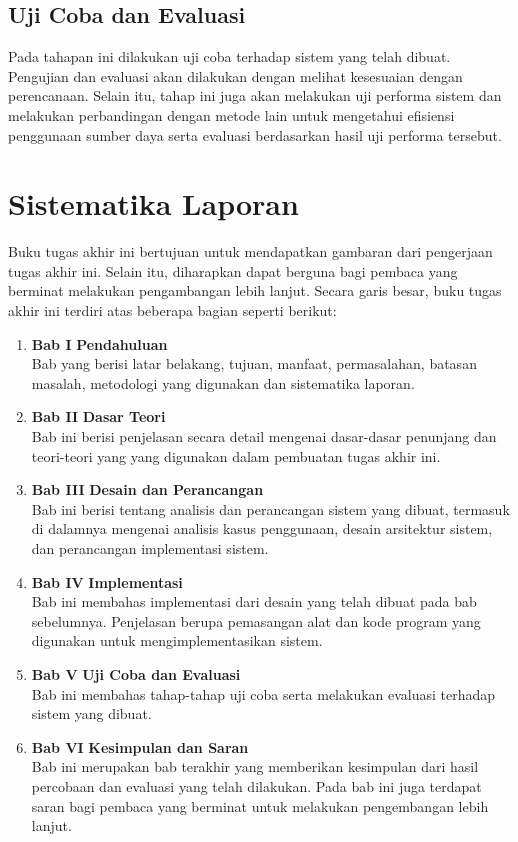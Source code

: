 \subsection{Uji Coba dan Evaluasi}
Pada tahapan ini dilakukan uji coba terhadap sistem yang telah dibuat. Pengujian dan evaluasi akan dilakukan dengan melihat kesesuaian dengan perencanaan. Selain itu, tahap ini juga akan melakukan uji performa sistem dan melakukan perbandingan dengan metode lain untuk mengetahui efisiensi penggunaan sumber daya serta evaluasi berdasarkan hasil uji performa tersebut. 

\section{Sistematika Laporan}
Buku tugas akhir ini bertujuan untuk mendapatkan gambaran dari pengerjaan tugas akhir ini. Selain itu, diharapkan dapat berguna bagi pembaca yang berminat melakukan pengambangan lebih lanjut. Secara garis besar, buku tugas akhir ini terdiri atas beberapa bagian seperti berikut:
\begin{enumerate}

\item \textbf{Bab I} \indent \textbf{Pendahuluan} \\        
\indent \indent Bab yang berisi latar belakang, tujuan, manfaat, permasalahan, batasan masalah, metodologi yang digunakan dan sistematika laporan.
\\
\item \textbf{Bab II} \indent \textbf{Dasar Teori}
\\
\indent \indent Bab ini berisi penjelasan secara detail mengenai dasar-dasar penunjang dan teori-teori yang yang digunakan dalam pembuatan tugas akhir ini.
\\
\item \textbf{Bab III} \indent \textbf{Desain dan Perancangan}
\\
\indent \indent Bab ini berisi tentang analisis dan perancangan sistem yang dibuat, termasuk di dalamnya mengenai analisis kasus penggunaan, desain arsitektur sistem, dan perancangan implementasi sistem.
\\
\item \textbf{Bab IV} \indent \textbf{Implementasi}
\\
\indent \indent Bab ini membahas implementasi dari desain yang telah dibuat pada bab sebelumnya. Penjelasan berupa pemasangan alat dan kode program yang digunakan untuk mengimplementasikan sistem.
\\
\item \textbf{Bab V} \indent \textbf{Uji Coba dan Evaluasi}
\\
\indent \indent Bab ini membahas tahap-tahap uji coba serta melakukan evaluasi terhadap sistem yang dibuat.
\\
\item \textbf{Bab VI} \indent \textbf{Kesimpulan dan Saran}
\\
\indent \indent Bab ini merupakan bab terakhir yang memberikan kesimpulan dari hasil percobaan dan evaluasi yang telah dilakukan. Pada bab ini juga terdapat saran bagi pembaca yang berminat untuk melakukan pengembangan lebih lanjut.    
\end{enumerate}
